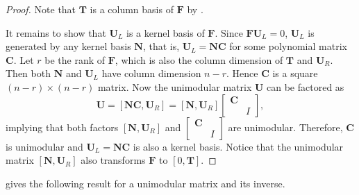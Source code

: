 \begin{proof}
Note that $\mathbf{T}$ is a column basis of $\mathbf{F}$ by .%
\begin{comment}
Note that $\mathbf{T}$ is a column basis of $\mathbf{F}$ by \prettyref{cor:unimodularlyReduceToColumnBasis}.
\end{comment}
{} It remains to show that $\mathbf{U}_{L}$ is a kernel basis of $\mathbf{F}$.
Since $\mathbf{F}\mathbf{U}_{L}=0$, $\mathbf{U}_{L}$ is generated
by any kernel basis $\mathbf{N}$, that is, $\mathbf{U}_{L}=\mathbf{N}\mathbf{C}$
for some polynomial matrix $\mathbf{C}$. Let $r$ be the rank of
$\mathbf{F}$, which is also the column dimension of $\mathbf{T}$
and $\mathbf{U}_{R}$. Then both $\mathbf{N}$ and $\mathbf{U}_{L}$
have column dimension $n-r$. Hence $\mathbf{C}$ is a square $(n-r)\times(n-r)$
matrix. Now the unimodular matrix $\mathbf{U}$ can be factored as
\[
\mathbf{U}=\left[\mathbf{N}\mathbf{C},\mathbf{U}_{R}\right]=\left[\mathbf{N},\mathbf{U}_{R}\right]\begin{bmatrix}\mathbf{C}\\
 & I
\end{bmatrix},
\]
 implying that both factors $\left[\mathbf{N},\mathbf{U}_{R}\right]$
and $\begin{bmatrix}\mathbf{C}\\
 & I
\end{bmatrix}$ are unimodular. Therefore, $\mathbf{C}$ is unimodular and $\mathbf{U}_{L}=\mathbf{N}\mathbf{C}$
is also a kernel basis. Notice that the unimodular matrix $\left[\mathbf{N},\mathbf{U}_{R}\right]$
also transforms $\mathbf{F}$ to $\left[0,\mathbf{T}\right]$.
\end{proof}
 gives the following
result for a unimodular matrix and its inverse.
